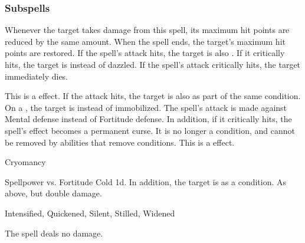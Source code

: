 \subsubsection{Subspells}
Whenever the target takes damage from this spell, its maximum hit points are reduced by the same amount.
When the spell ends, the target's maximum hit points are restored.
If the spell's attack hits, the target is also \dazzled. If it critically hits, the target is \blinded instead of dazzled.
If the spell's attack critically hits, the target immediately dies.
\par
This is a  effect.
If the attack hits, the target is also  as part of the same condition.
On a , the target is  instead of immobilized.
The spell's attack is made against Mental defense instead of Fortitude defense.
In addition, if it critically hits, the spell's effect becomes a permanent curse.
It is no longer a condition, and cannot be removed by abilities that remove conditions.
This is a  effect.
\begin{spellsection}{Cryomancy}
\begin{spellheader}
\end{spellheader}
\begin{spellcontent}
\begin{spelltargetinginfo}
\end{spelltargetinginfo}
\begin{spelleffects}
\begin{spellattack}{Spellpower vs. Fortitude}
\spellsuccess
Cold  \minus1d.
In addition, the target is \fatigued as a condition.
\spellcritical As above, but double damage.
\end{spellattack}
\end{spelleffects}
\end{spellcontent}
\begin{spellfooter}
 Intensified, Quickened, Silent, Stilled, Widened
\end{spellfooter}
\begin{spellsubcontent}
\begin{spellcantrip}
The spell deals no damage.
\end{spellcantrip}
\end{spellsubcontent}
\end{spellsection}
